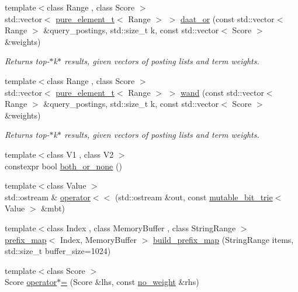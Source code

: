 \begin{DoxyCompactItemize}
{\footnotesize template$<$class Range , class Score $>$ }\\std\+::vector$<$ \mbox{\hyperlink{namespaceirk_a1e48b43a3f40d553264380da5e7263c1}{pure\+\_\+element\+\_\+t}}$<$ Range $>$ $>$ \mbox{\hyperlink{namespaceirk_ab92f82aeeb765f3464ca61f190d8f919}{daat\+\_\+or}} (const std\+::vector$<$ Range $>$ \&query\+\_\+postings, std\+::size\+\_\+t k, const std\+::vector$<$ Score $>$ \&weights)
\begin{DoxyCompactList}\small\item\em Returns top-\/$\ast$k$\ast$ results, given vectors of posting lists and term weights. \end{DoxyCompactList}\item 
{\footnotesize template$<$class Range , class Score $>$ }\\std\+::vector$<$ \mbox{\hyperlink{namespaceirk_a1e48b43a3f40d553264380da5e7263c1}{pure\+\_\+element\+\_\+t}}$<$ Range $>$ $>$ \mbox{\hyperlink{namespaceirk_a8f6987f583ef7a5eff4291ccea6d7170}{wand}} (const std\+::vector$<$ Range $>$ \&query\+\_\+postings, std\+::size\+\_\+t k, const std\+::vector$<$ Score $>$ \&weights)
\begin{DoxyCompactList}\small\item\em Returns top-\/$\ast$k$\ast$ results, given vectors of posting lists and term weights. \end{DoxyCompactList}\item 
{\footnotesize template$<$class V1 , class V2 $>$ }\\constexpr bool \mbox{\hyperlink{namespaceirk_abce08dade53e33dcfa31946305eee6ce}{both\+\_\+or\+\_\+none}} ()
\item 
{\footnotesize template$<$class Value $>$ }\\std\+::ostream \& \mbox{\hyperlink{namespaceirk_aac8001645bff72cf73bf0f87512c5ed4}{operator$<$$<$}} (std\+::ostream \&out, const \mbox{\hyperlink{classirk_1_1mutable__bit__trie}{mutable\+\_\+bit\+\_\+trie}}$<$ Value $>$ \&mbt)
\item 
{\footnotesize template$<$class Index , class Memory\+Buffer , class String\+Range $>$ }\\\mbox{\hyperlink{classirk_1_1prefix__map}{prefix\+\_\+map}}$<$ Index, Memory\+Buffer $>$ \mbox{\hyperlink{namespaceirk_a3f96e383c5e7c9f697953cdc4ae30b00}{build\+\_\+prefix\+\_\+map}} (String\+Range items, std\+::size\+\_\+t buffer\+\_\+size=1024)
\item 
{\footnotesize template$<$class Score $>$ }\\Score \mbox{\hyperlink{namespaceirk_ab8e6b6b40ddf91037ece69b4c14d091f}{operator$\ast$=}} (Score \&lhs, const \mbox{\hyperlink{structirk_1_1no__weight}{no\+\_\+weight}} \&rhs)

\end{DoxyCompactItemize}
